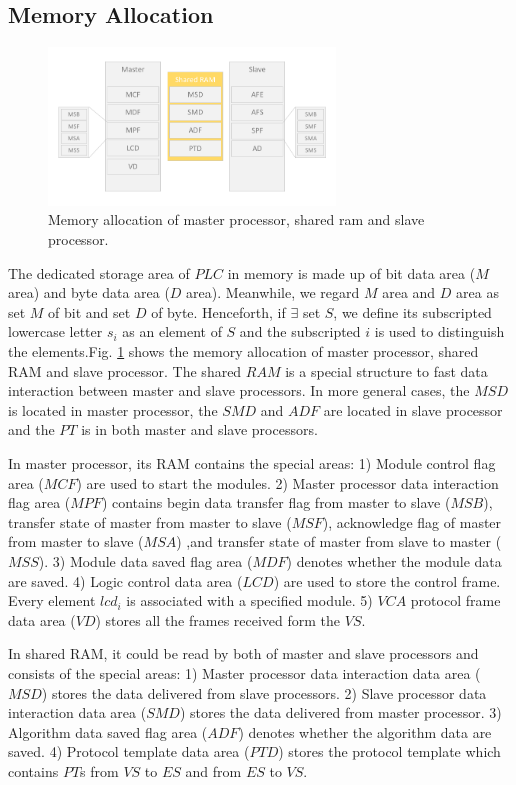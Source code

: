 \documentclass[journal,UTF8]{IEEEtran}
\begin{document}
\subsection{Memory Allocation}
\begin{figure}
	\centering
	\includegraphics[width=3in]{fig/RAM.pdf}
	\caption{Memory allocation of master processor, shared ram and slave processor.}
	\label{fig:RAM}
\end{figure}
The dedicated storage area of $PLC$ in memory is made up of bit data area ($M$ area) and byte data area ($D$ area). Meanwhile, we regard $M$ area and $D$ area as set $M$ of bit and set $D$ of byte. Henceforth, if $\exists$ set $S$, we define its subscripted lowercase letter $s_i$ as an element of $S$ and the subscripted $i$ is used to distinguish the elements.Fig. \ref{fig:RAM} shows the memory allocation of master processor, shared RAM and slave processor. The shared $RAM$ is a special structure to fast data interaction between master and slave processors. In more general cases, the $MSD$ is located in master processor, the $SMD$ and $ADF$ are located in slave processor and the $PT$ is in both master and slave processors. 

In master processor, its RAM contains the special areas: 1) Module control flag area ($MCF$) are used to start the modules. 2) Master processor data interaction flag area ($MPF$) contains begin data transfer flag from master to slave ($MSB$), transfer state of master from master to slave ($MSF$), acknowledge flag of master from master to slave ($MSA$) ,and transfer state of master from slave to master ($MSS$). 3) Module data saved flag area ($MDF$) denotes whether the module data are saved. 4) Logic control data area ($LCD$) are used to store the control frame. Every element $lcd_i$ is associated with a specified module. 5) $VCA$ protocol frame data area ($VD$) stores all the frames received form the $VS$.  

In shared RAM, it could be read by both of master and slave processors and consists of the special areas: 1) Master processor data interaction data area ($MSD$) stores the data delivered from slave processors. 2) Slave processor data interaction data area ($SMD$) stores the data delivered from master processor. 3) Algorithm data saved flag area ($ADF$) denotes whether the algorithm data are saved. 4) Protocol template data area ($PTD$) stores the protocol template which contains $PT$s from $VS$ to $ES$ and from $ES$ to $VS$.
\end{document}
